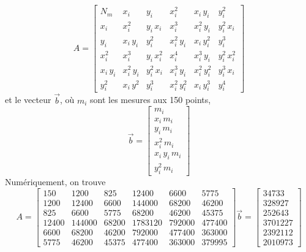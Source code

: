 \begin{equation}
    A=
    \begin{bmatrix}
        N_m      & x_i        & y_i        & x_i^2        & x_i\,y_i     & y_i^2        \\
        x_i      & x_i^2      & y_i\,x_i   & x_i^3        & x_i^2\,y_i   & y_i^2\,x_i   \\
        y_i      & x_i\,y_i   & y_i^2      & x_i^2\,y_i   & x_i\,y_i^2   & y_i^3        \\
        x_i^2    & x_i^3      & y_i\,x_i^2 & x_i^4        & x_i^3\,y_i   & y_i^2\,x_i^2 \\
        x_i\,y_i & x_i^2\,y_i & y_i^2\,x_i & x_i^3\,y_i   & x_i^2\,y_i^2 & y_i^3\,x_i   \\
        y_i^2    & x_i\,y^2   & y_i^3      & x_i^2\,y_i^2 & x_i\,y_i^3   & y_i^4
    \end{bmatrix}
\end{equation}
et le vecteur $\vec{b}$, où $m_i$ sont les mesures aux 150 points,
\begin{equation}
    \vec{b}=
    \begin{bmatrix}
        m_i           \\
        x_i\,m_i      \\
        y_i\,m_i      \\
        x_i^2\,m_i    \\
        x_i\,y_i\,m_i \\
        y_i^2\,m_i
    \end{bmatrix}
\end{equation}
Numériquement, on trouve
\begin{equation}
    A=
    \begin{bmatrix}
        150   & 1200   & 825   & 12400   & 6600   & 5775   \\
        1200  & 12400  & 6600  & 144000  & 68200  & 46200  \\
        825   & 6600   & 5775  & 68200   & 46200  & 45375  \\
        12400 & 144000 & 68200 & 1783120 & 792000 & 477400 \\
        6600  & 68200  & 46200 & 792000  & 477400 & 363000 \\
        5775  & 46200  & 45375 & 477400  & 363000 & 379995
    \end{bmatrix}
    \vec{b}=
    \begin{bmatrix}
        34733   \\
        328927  \\
        252643  \\
        3701227 \\
        2392112 \\
        2010973
    \end{bmatrix}
\end{equation}
